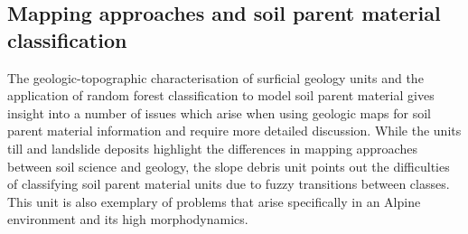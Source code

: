 \documentclass[preprint,12pt,authoryear]{elsarticle}
\begin{document}
\subsection{Mapping approaches and soil parent material classification}
The geologic-topographic characterisation of surficial geology units and the application of random forest classification to model soil parent material gives insight into a number of issues which arise when using geologic maps for soil parent material information and require more detailed discussion. While the units till and landslide deposits highlight the differences in mapping approaches between soil science and geology, the slope debris unit points out the difficulties of classifying soil parent material units due to fuzzy transitions between classes. This unit is also exemplary of problems that arise specifically in an Alpine environment and its high morphodynamics.  
\end{document}
